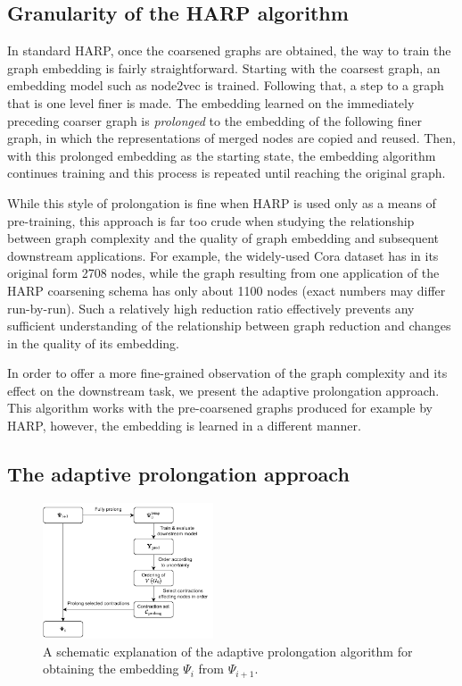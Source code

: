 \documentclass[sn-mathphys,pdflatex,iicol]{sn-jnl}%
\newcommand{\name}[1]{\textit{#1}}
\begin{document}
\subsection{Granularity of the HARP algorithm}

In standard HARP, once the coarsened graphs are obtained, the way to train the graph embedding is fairly straightforward. Starting with the coarsest graph, an embedding model such as node2vec is trained. Following that, a step to a graph that is one level finer is made. The embedding learned on the immediately preceding coarser graph is \name{prolonged} to the embedding of the following finer graph, in which the representations of merged nodes are copied and reused.
 Then, with this prolonged embedding as the starting state, the embedding algorithm continues training and this process is repeated until reaching the original graph.

While this style of prolongation is fine when HARP is used only as a means of pre-training, this approach is far too crude when studying the relationship between graph complexity and the quality of graph embedding and subsequent downstream applications. For example, the widely-used Cora dataset \cite{yang_revisiting_2016} has in its original form 2708 nodes, while the graph resulting from one application of the HARP coarsening schema has only about 1100 nodes (exact numbers may differ run-by-run). Such a relatively high reduction ratio effectively prevents any sufficient understanding of the relationship between graph reduction and changes in the quality of its embedding.

In order to offer a more fine-grained observation of the graph complexity and its effect on the downstream task, we present the adaptive prolongation approach. This algorithm works with the pre-coarsened graphs produced for example by HARP, however, the embedding is learned in a different manner.

\subsection{The adaptive prolongation approach}\label{sec:adaptive-prolongation}

\begin{figure}
  \centering
  \includegraphics[width=0.45\textwidth]{adaptive-prolongation.pdf}
    \caption{A schematic explanation of the adaptive prolongation algorithm for obtaining the embedding \( \Psi_{i} \) from \( \Psi_{i + 1} \).}
  \label{fig:adaptive-prolongation}
\end{figure}
\end{document}
